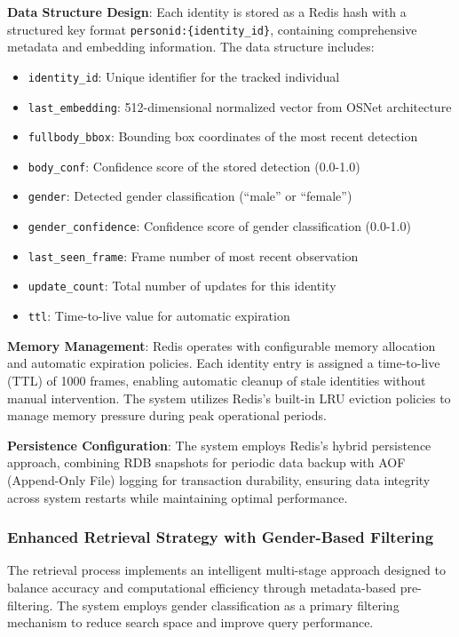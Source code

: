 \textbf{Data Structure Design}: Each identity is stored as a Redis hash with a structured key format \texttt{personid:\{identity\_id\}}, containing comprehensive metadata and embedding information. The data structure includes:

\begin{itemize}
   \item \texttt{identity\_id}: Unique identifier for the tracked individual
   \item \texttt{last\_embedding}: 512-dimensional normalized vector from OSNet architecture 
   \item \texttt{fullbody\_bbox}: Bounding box coordinates of the most recent detection
   \item \texttt{body\_conf}: Confidence score of the stored detection (0.0-1.0)
   \item \texttt{gender}: Detected gender classification (``male'' or ``female'')
   \item \texttt{gender\_confidence}: Confidence score of gender classification (0.0-1.0)
   \item \texttt{last\_seen\_frame}: Frame number of most recent observation
   \item \texttt{update\_count}: Total number of updates for this identity
   \item \texttt{ttl}: Time-to-live value for automatic expiration
\end{itemize}

\textbf{Memory Management}: Redis operates with configurable memory allocation and automatic expiration policies. Each identity entry is assigned a time-to-live (TTL) of 1000 frames, enabling automatic cleanup of stale identities without manual intervention. The system utilizes Redis's built-in LRU eviction policies to manage memory pressure during peak operational periods.

\textbf{Persistence Configuration}: The system employs Redis's hybrid persistence approach, combining RDB snapshots for periodic data backup with AOF (Append-Only File) logging for transaction durability, ensuring data integrity across system restarts while maintaining optimal performance.

\subsubsection{Enhanced Retrieval Strategy with Gender-Based Filtering}

The retrieval process implements an intelligent multi-stage approach designed to balance accuracy and computational efficiency through metadata-based pre-filtering. The system employs gender classification as a primary filtering mechanism to reduce search space and improve query performance.

